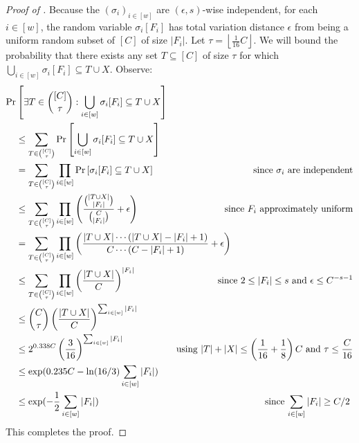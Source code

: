 \documentclass[10pt]{article}
\theoremstyle{definition}\newtheorem{definition}[lemma]{Definition}
\theoremstyle{remark}  \newtheorem*{remark}{Remark}
\newcommand{\floor}[1]{{\left\lfloor{#1}\right\rfloor}}
\begin{document}
\begin{proof}[Proof of ]
  Because the $(\sigma_i)_{i \in [w]}$ are $(\epsilon,s)$-wise independent, for each $i \in [w]$, the random variable $\sigma_i[F_i]$ has total variation distance $\epsilon$ from being a uniform random subset of $[C]$ of size $|F_i|$. Let $\tau = \floor{\frac{1}{16} C}$. We will bound the probability that there exists any set $T \subseteq [C]$ of size $\tau$ for which $\bigcup_{i \in [w]} \sigma_i[F_i] \subseteq T \cup X$. Observe:
  \begin{align*}
    \Pr&\left[\exists T \in \binom{[C]}{\tau} : \bigcup_{i \in [w]} \sigma_i[F_i] \subseteq T \cup X \right] \\
      &\le \sum_{T \in \binom{[C]}{\tau}} \Pr\left[\bigcup_{i \in [w]} \sigma_i[F_i] \subseteq T \cup X \right] \\
      &= \sum_{T \in \binom{[C]}{\tau}} \prod_{i \in [w]} \Pr\left[\sigma_i[F_i] \subseteq T \cup X \right] & \text{since $\sigma_i$ are independent} \\
      &\le \sum_{T \in \binom{[C]}{\tau}} \prod_{i \in [w]} \left(\frac{\binom{|T \cup X|}{|F_i|}}{\binom{C}{|F_i|}} + \epsilon\right) & \hspace{-2cm}\text{since $F_i$ approximately uniform} \\
      &= \sum_{T \in \binom{[C]}{\tau}} \prod_{i \in [w]} \left(\frac{|T\cup X| \cdots (|T \cup X| - |F_i| + 1)}{C \cdots (C - |F_i| + 1)} + \epsilon\right)\hspace{-4cm} \\
      &\le \sum_{T \in \binom{[C]}{\tau}} \prod_{i \in [w]} \left(\frac{|T\cup X|}{C}\right)^{|F_i|} & \hspace{-2cm}\text{since $2 \le |F_i| \le s$ and $\epsilon \le C^{-s - 1}$} \\
      &\le \binom{C}{\tau} \left(\frac{|T\cup X|}{C}\right)^{\sum_{i \in [w]} |F_i|} \\
      &\le 2^{0.338 C} \left(\frac{3}{16}\right)^{\sum_{i \in [w]} |F_i|} & \text{using $|T|+|X| \le \left(\frac{1}{16} + \frac{1}{8}\right) C$ and $\tau \le \frac{C}{16}$}\\
      &\le \exp( 0.235 C - \ln(16/3) \sum_{i \in [w]} |F_i|) \\
      &\le \exp( - \frac{1}{2} \sum_{i \in [w]} |F_i| ) & \text{since $\sum_{i \in [w]} |F_i| \ge C / 2$ }
  \end{align*}
  This completes the proof.
\end{proof}
\end{document}
